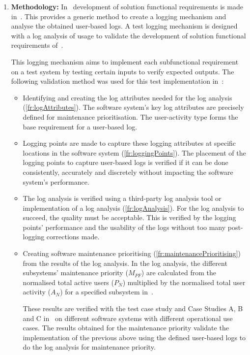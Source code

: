 \begin{enumerate}[label=\textbf{\Roman*.}]
	\item \textbf{Methodology:} In~ development of solution functional requirements is made in~. This provides a generic method to create a logging mechanism and analyse the obtained user-based logs. A test logging mechanism is designed with a log analysis of usage to validate the development of solution functional requirements of~.\par This logging mechanism aims to implement each subfunctional requirement on a test system by testing certain inputs to verify expected outputs. The following validation method was used for this test implementation in~:
		\begin{itemize}
			\item Identifying and creating the log attributes needed for the log analysis (\ref{fr:logAttributes}). The software system's key log attributes are precisely defined for maintenance prioritisation. The user-activity type forms the base requirement for a user-based log.
			
			\item Logging points are made to capture these logging attributes at specific locations in the software system (\ref{fr:loggingPoints}). The placement of the logging points to capture user-based logs is verified if it can be done consistently, accurately and discretely without impacting the software system's performance. 
			
			\item The log analysis is verified using a third-party log analysis tool or implementation of a log analysis (\ref{fr:logAnalysis}). For the log analysis to succeed, the quality must be acceptable. This is verified by the logging points' performance and the usability of the logs without too many post-logging corrections made.
			
			\item Creating software maintenance prioritising (\ref{fr:maintenancePrioritising}) from the results of the log analysis. In the log analysis, the different subsystems' maintenance priority ($M_{PF}$) are calculated from the normalised total active users ($P_N$) multiplied by the normalised total user activity ($A_N$) for a specified subsystem in~.\par These results are verified with the test case study and Case Studies A, B and C in~ on different software systems with different operational use cases. The results obtained for the maintenance priority validate the implementation of the previous above using the defined user-based logs to do the log analysis for maintenance priority. 
		\end{itemize}


\end{enumerate}
